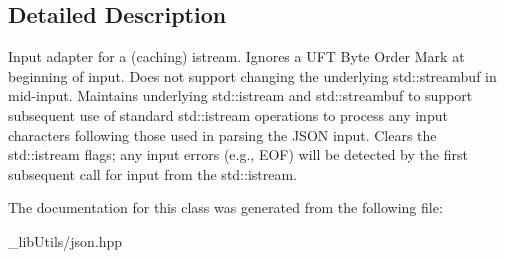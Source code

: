 \subsection{Detailed Description}
Input adapter for a (caching) istream. Ignores a U\+FT Byte Order Mark at beginning of input. Does not support changing the underlying std\+::streambuf in mid-\/input. Maintains underlying std\+::istream and std\+::streambuf to support subsequent use of standard std\+::istream operations to process any input characters following those used in parsing the J\+S\+ON input. Clears the std\+::istream flags; any input errors (e.\+g., E\+OF) will be detected by the first subsequent call for input from the std\+::istream. 

The documentation for this class was generated from the following file\+:\begin{DoxyCompactItemize}
\item 
\+\_\+lib\+Utils/json.\+hpp\end{DoxyCompactItemize}
